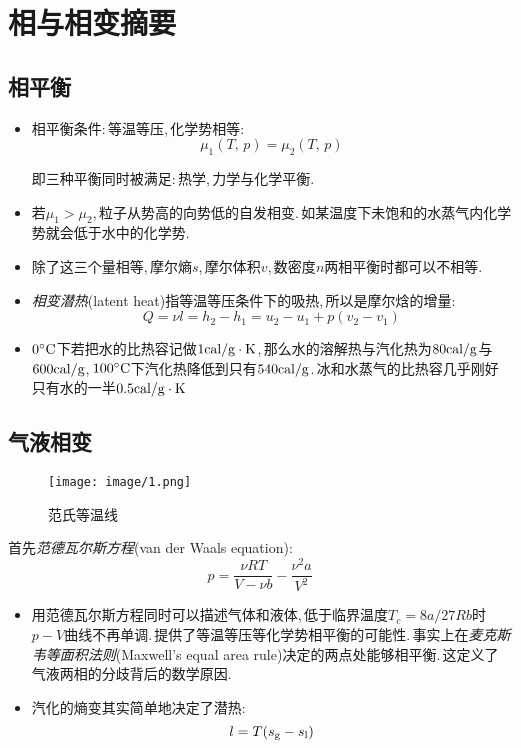 \chapter{相与相变摘要}


\section{相平衡}

\begin{itemize}
	\item 相平衡条件:\,等温等压,\,化学势相等:\,
	\[\mu_1(T,\,p)=\mu_2(T,\,p)\]

	即三种平衡同时被满足:\,热学,\,力学与化学平衡.

	\item 若$\mu_1>\mu_2$,\,粒子从势高的向势低的自发相变.\,如某温度下未饱和的水蒸气内化学势就会低于水中的化学势.

	\item 除了这三个量相等,\,摩尔熵$s$,\,摩尔体积$v$,\,数密度$n$两相平衡时都可以不相等.

	\item \emph{相变潜热}(latent heat)指等温等压条件下的吸热,\,所以是摩尔焓的增量:
	\[Q=\nu l=h_2-h_1=u_2-u_1+p(v_2-v_1)\]

	\item $0^\circ \mathrm{C}$下若把水的比热容记做$1{\rm cal/g\cdot K}$,\,那么水的溶解热与汽化热为$80{\rm cal/g}$与$600{\rm cal/g}$,\,$100^\circ \mathrm{C}$下汽化热降低到只有$540{\rm cal/g}$.\,冰和水蒸气的比热容几乎刚好只有水的一半$0.5{\rm cal/g\cdot K}$
\end{itemize}

\section{气液相变}
\begin{wrapfigure}[9]{o}[-10pt]{7cm}
\centering
\texttt{[image: image/1.png]}
\caption{范氏等温线}
\end{wrapfigure}
首先\emph{范德瓦尔斯方程}(van der Waals equation):
\[p=\frac{\nu RT}{V-\nu b}-\frac{\nu^2 a}{V^2}\]
\begin{itemize}
	\item 用范德瓦尔斯方程同时可以描述气体和液体,\,低于临界温度$T_c=8a/27Rb$时$p-V$曲线不再单调.\,提供了等温等压等化学势相平衡的可能性.\,事实上在\emph{麦克斯韦等面积法则}(Maxwell's equal area rule)决定的两点处能够相平衡.\,这定义了气液两相的分歧背后的数学原因.
	\item 汽化的熵变其实简单地决定了潜热:
	\[l=T(s_{\rm g}-s_{\rm l})\]
	\end{itemize}

